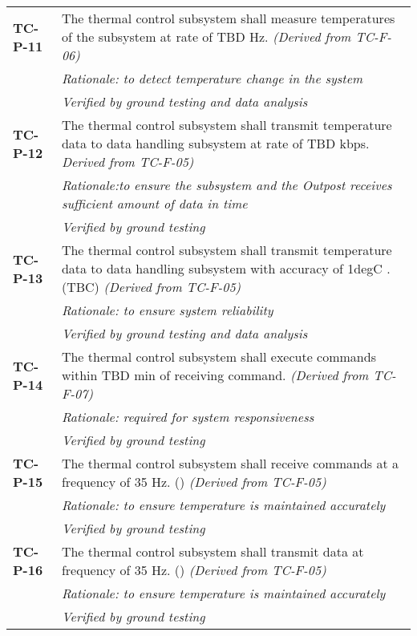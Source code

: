 \begin{longtable}{P{2cm}P{13.25cm}}
\textbf{TC-P-11}	& The thermal control subsystem shall measure temperatures of the subsystem at rate of \gls{TBD} \gls{Hz}. \textit{(Derived from TC-F-06)} \\ 
 & \textit{Rationale: to detect temperature change in the system} \\
 &  \textit{Verified by ground testing and data analysis}	\\
 
\textbf{TC-P-12}	& The thermal control subsystem shall transmit temperature data to data handling subsystem at rate of \gls{TBD} \gls{kbps}. \textit{Derived from TC-F-05)} \\
 & \textit{Rationale:to ensure the subsystem and the Outpost receives sufficient amount of data in time} \\
 &  \textit{Verified by ground testing}			\\

\textbf{TC-P-13}	& The thermal control subsystem shall transmit temperature data to data handling subsystem with accuracy of 1\gls{degC} \cite{temp_sensors}. (\gls{TBC}) \textit{(Derived from TC-F-05)} \\
 & \textit{Rationale: to ensure system reliability} \\
 & \textit{Verified by ground testing and data analysis}		\\
 
\textbf{TC-P-14}	& The thermal control subsystem shall execute commands within \gls{TBD} \gls{min} of receiving command. \textit{(Derived from TC-F-07)}\\
 & \textit{Rationale: required for system responsiveness} \\
 &  \textit{Verified by ground testing}								\\
 
\textbf{TC-P-15}	& The thermal control subsystem shall receive commands at a frequency of 35 \gls{Hz}. (\textit{}) \textit{(Derived from TC-F-05)} \\
 & \textit{Rationale: to ensure temperature is maintained accurately} \\
 &  \textit{Verified by ground testing}	\\

\textbf{TC-P-16}	& The thermal control subsystem shall transmit data at frequency of 35 \gls{Hz}. (\textit{})
\textit{(Derived from TC-F-05)} \\
 & \textit{Rationale: to ensure temperature is maintained accurately} \\
 &  \textit{Verified by ground testing}	
\end{longtable}

